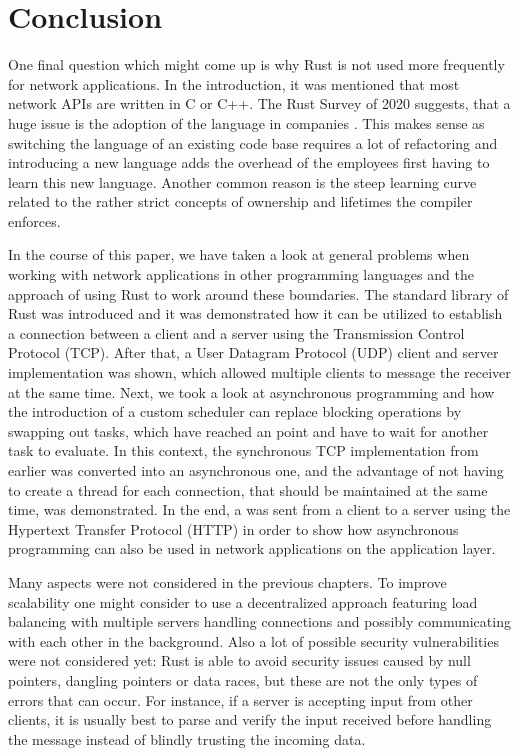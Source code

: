 
\section{Conclusion}
One final question which might come up is why Rust is not used more frequently for network applications. In the
introduction, it was mentioned that most network APIs are written in C or C++. The Rust Survey of 2020 suggests, that a
huge issue is the adoption of the language in companies \cite{rust-survey}. This makes sense as switching the language
of an existing code base requires a lot of refactoring and introducing a new language adds the overhead of the
employees first having to learn this new language. Another common reason is the steep learning curve related to the
rather strict concepts of ownership and lifetimes the compiler enforces.

In the course of this paper, we have taken a look at general problems when working with network applications in other
programming languages and the approach of using Rust to work around these boundaries. The standard library of Rust was
introduced and it was demonstrated how it can be utilized to establish a connection between a client and a server using
the Transmission Control Protocol (TCP). After that, a User Datagram Protocol (UDP) client and server implementation
was shown, which allowed multiple clients to message the receiver at the same time. Next, we took a look at
asynchronous programming and how the introduction of a custom scheduler can replace blocking operations by swapping out
tasks, which have reached an  point and have to wait for another task to evaluate. In this context, the
synchronous TCP implementation from earlier was converted into an asynchronous one, and the advantage of not having to
create a thread for each connection, that should be maintained at the same time, was demonstrated. In the end, a
 was sent from a client to a server using the Hypertext Transfer Protocol (HTTP) in order to show how
asynchronous programming can also be used in network applications on the application layer.

Many aspects were not considered in the previous chapters. To improve scalability one might consider to use a
decentralized approach featuring load balancing with multiple servers handling connections and possibly communicating
with each other in the background. Also a lot of possible security vulnerabilities were not considered yet: Rust is
able to avoid security issues caused by null pointers, dangling pointers or data races, but these are not the only
types of errors that can occur. For instance, if a server is accepting input from other clients, it is usually best to
parse and verify the input received before handling the message instead of blindly trusting the incoming data.

